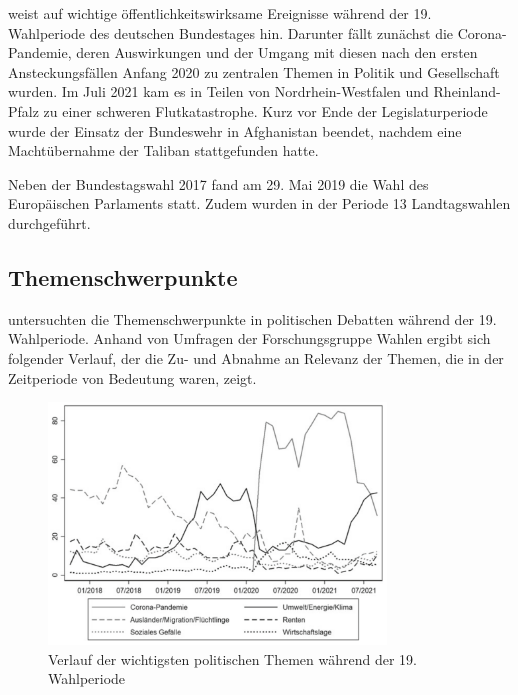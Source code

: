 \textcite{schmid_deutscher_2021} weist auf wichtige öffentlichkeitswirksame Ereignisse während der \num{19}. Wahlperiode des deutschen Bundestages hin. Darunter fällt zunächst die Corona-Pandemie, deren Auswirkungen und der Umgang mit diesen nach den ersten Ansteckungsfällen Anfang 2020 zu zentralen Themen in Politik und Gesellschaft wurden. Im Juli 2021 kam es in Teilen von Nordrhein-Westfalen und Rheinland-Pfalz zu einer schweren Flutkatastrophe. Kurz vor Ende der Legislaturperiode wurde der Einsatz der Bundeswehr in Afghanistan beendet, nachdem eine Machtübernahme der Taliban stattgefunden hatte.

Neben der Bundestagswahl \num{2017} fand am 29. Mai 2019 die Wahl des Europäischen Parlaments statt. Zudem wurden in der Periode \num{13} Landtagswahlen durchgeführt.

\subsection{Themenschwerpunkte} \label{subsec:themenschwerpunkte}

\textcite{engler_wettbewerb_2022} untersuchten die Themenschwerpunkte in politischen Debatten während der \num{19}. Wahlperiode. Anhand von Umfragen der Forschungsgruppe Wahlen ergibt sich folgender Verlauf, der die Zu- und Abnahme an Relevanz der Themen, die in der Zeitperiode von Bedeutung waren, zeigt.

\begin{figure}[H]
  \centering
  \includegraphics[width=0.8\textwidth]{data/images/themenkonjunktur.png}
  \caption{Verlauf der wichtigsten politischen Themen während der 19. Wahlperiode \autocite{engler_wettbewerb_2022, forschungsgruppe_wahlen_forschungsgruppe_nodate}} \label{fig:themenkonjunktur}
\end{figure}

